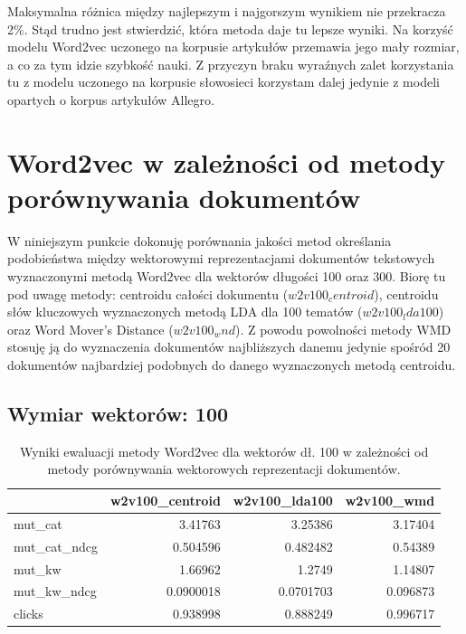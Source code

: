 \documentclass[pl]{minipw} %
\begin{document}
Maksymalna różnica między najlepszym i najgorszym wynikiem nie przekracza 2\%. Stąd trudno jest stwierdzić, która metoda daje tu lepsze wyniki. Na korzyść modelu Word2vec uczonego na korpusie artykułów przemawia jego mały rozmiar, a co za tym idzie szybkość nauki. Z przyczyn braku wyraźnych zalet korzystania tu z modelu uczonego na korpusie słowosieci korzystam dalej jedynie z modeli opartych o korpus artykułów Allegro.

\section{Word2vec w zależności od metody porównywania dokumentów}

W niniejszym punkcie dokonuję porównania jakości metod określania podobieństwa między wektorowymi reprezentacjami dokumentów tekstowych wyznaczonymi metodą Word2vec dla wektorów długości 100 oraz 300. Biorę tu pod uwagę metody: centroidu całości dokumentu ($w2v100_centroid$), centroidu słów kluczowych wyznaczonych metodą LDA dla 100 tematów ($w2v100_lda100$) oraz Word Mover's Distance ($w2v100_wnd$). Z powodu powolności metody WMD stosuję ją do wyznaczenia dokumentów najbliższych danemu jedynie spośród 20 dokumentów najbardziej podobnych do danego wyznaczonych metodą centroidu.

\subsection{Wymiar wektorów: 100}

\begin{table}
	\centering
	\begin{tabular}{lrrr}
		\hline
		&   w2v100\_centroid &   w2v100\_lda100 &   w2v100\_wmd \\
		\hline
		mut\_cat      &         3.41763   &       3.25386   &     3.17404  \\
		mut\_cat\_ndcg &         0.504596  &       0.482482  &     0.54389  \\
		mut\_kw       &         1.66962   &       1.2749    &     1.14807  \\
		mut\_kw\_ndcg  &         0.0900018 &       0.0701703 &     0.096873 \\
		clicks       &         0.938998  &       0.888249  &     0.996717 \\
		\hline
	\end{tabular}
	\caption{Wyniki ewaluacji metody Word2vec dla wektorów dł. 100 w zależności od metody porównywania wektorowych reprezentacji dokumentów.}
\end{table}
\end{document}
